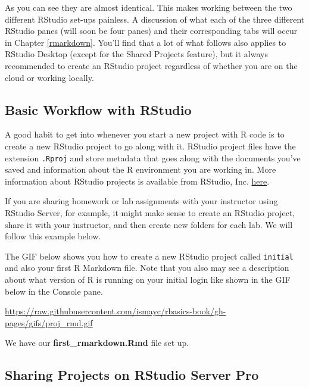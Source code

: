 \documentclass[]{tufte-book}
\begin{document}
As you can see they are almost identical. This makes working between the
two different RStudio set-ups painless. A discussion of what each of the
three different RStudio panes (will soon be four panes) and their
corresponding tabs will occur in Chapter \ref{rmarkdown}. You'll find
that a lot of what follows also applies to RStudio Desktop (except for
the Shared Projects feature), but it always recommended to create an
RStudio project regardless of whether you are on the cloud or working
locally.

\subsection{Basic Workflow with
RStudio}\label{basic-workflow-with-rstudio}

A good habit to get into whenever you start a new project with R code is
to create a new RStudio project to go along with it. RStudio project
files have the extension \texttt{.Rproj} and store metadata that goes
along with the documents you've saved and information about the R
environment you are working in. More information about RStudio projects
is available from RStudio, Inc.
\href{https://support.rstudio.com/hc/en-us/articles/200526207-Using-Projects}{here}.

If you are sharing homework or lab assignments with your instructor
using RStudio Server, for example, it might make sense to create an
RStudio project, share it with your instructor, and then create new
folders for each lab. We will follow this example below.

The GIF below shows you how to create a new RStudio project called
\texttt{initial} and also your first R Markdown file. Note that you also
may see a description about what version of R is running on your initial
login like shown in the GIF below in the Console pane.

\vspace{0.1in}

\begin{center}\footnotesize{\url{https://raw.githubusercontent.com/ismayc/rbasics-book/gh-pages/gifs/proj_rmd.gif}}\end{center}

\vspace{0.1in}

We have our \textbf{first\_rmarkdown.Rmd} file set up.

\subsection{Sharing Projects on RStudio Server
Pro}\label{sharing-projects-on-rstudio-server-pro}
\end{document}

